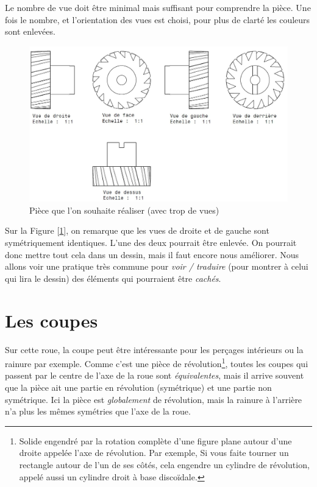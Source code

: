 \documentclass[
	11pt, %
	fleqn, %
	a4paper, %
]{LegrandOrangeBook}
\begin{document}
Le nombre de vue doit être minimal mais suffisant pour comprendre la pièce. Une fois le nombre, et l'orientation des vues est choisi, pour plus de clarté les couleurs sont enlevées.

\begin{figure}[H] %
	\centering %
	\includegraphics[width=1\textwidth]{Images/roue2.JPG} %
	\caption{Pièce que l'on souhaite réaliser (avec trop de vues)}
	\label{Roue3} %
\end{figure}

Sur la Figure [\ref{Roue3}], on remarque que les vues de droite et de gauche sont symétriquement identiques. L'une des deux pourrait être enlevée. On pourrait donc mettre tout cela dans un dessin, mais il faut encore nous améliorer. Nous allons voir une pratique très commune pour \textit{voir / traduire} (pour montrer à celui qui lira le dessin) des éléments qui pourraient être \textit{cachés}.

\section{Les coupes}

Sur cette roue, la coupe peut être intéressante pour les perçages intérieurs ou la rainure par exemple. Comme c'est une pièce de révolution\footnote{Solide engendré par la rotation complète d’une figure plane autour d’une droite appelée l’axe de révolution. Par exemple, Si vous faite tourner un rectangle autour de l’un de ses côtés, cela engendre un cylindre de révolution, appelé aussi un cylindre droit à base discoïdale.}, toutes les coupes qui passent par le centre de l'axe de la roue sont \textit{équivalentes}, mais il arrive souvent que la pièce ait une partie en révolution (symétrique) et une partie non symétrique. Ici la pièce est \textit{globalement} de révolution, mais la rainure à l'arrière n'a plus les mêmes symétries que l'axe de la roue.
\end{document}
